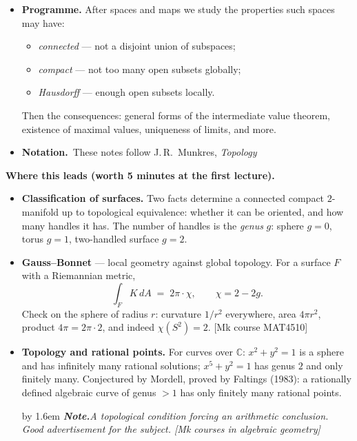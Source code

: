\documentclass[12pt,a4paper]{article}
\newcommand{\Ntn}{\textbf{Notation.}~}
\newcommand{\Mk}[1]{{\footnotesize\textcolor{cue}{[Mk #1]}}}  %
\newcommand{\Cue}[1]{%
  \par\addvspace{7pt}\nopagebreak
  \begingroup
    \advance\leftskip by 1.6em
    \parindent=0pt \small\color{cue}%
    \textbf{\textit{Note.}}\enspace \textit{#1}\par
  \endgroup
  \addvspace{9pt}}
\newenvironment{BL}%
  {\begin{itemize}[leftmargin=1.4em,labelsep=0.55em,itemsep=11pt,topsep=11pt,parsep=0pt]}%
  {\end{itemize}}
\newenvironment{SB}%
  {\begin{itemize}[label=--,leftmargin=1.3em,labelsep=0.45em,itemsep=6pt,topsep=7pt,parsep=0pt]}%
  {\end{itemize}}
\newcommand{\RR}{\mathbb{R}}
\newcommand{\CX}{\mathbb{C}}
\begin{document}
\begin{BL}
      subsequent definition of a continuous map. Same pattern as linear algebra: ``$f$ is
      linear if $f(\lambda x+\mu y)=\lambda f(x)+\mu f(y)$'' is simple, but presupposes the
      abstract definition of a real vector space, which in turn presupposes the nine-odd field
      axioms for $\RR$.
\Cue{Moral: axiomatisations of the most fundamental objects are general enough to be hard to
grasp at once. It is the \emph{relations} between them --- continuous maps, linear
transformations --- that are concrete. Say this early; it defuses a lot of anxiety.}
\item \textbf{Programme.} After spaces and maps we study the properties such spaces may have:
  \begin{SB}
  \item \emph{connected} --- not a disjoint union of subspaces;
  \item \emph{compact} --- not too many open subsets globally;
  \item \emph{Hausdorff} --- enough open subsets locally.
  \end{SB}
  Then the consequences: general forms of the intermediate value theorem, existence of maximal
  values, uniqueness of limits, and more.
\item \Ntn These notes follow J.\,R.\ Munkres, \emph{Topology}
\end{BL}

\textbf{Where this leads (worth 5 minutes at the first lecture).}

\begin{BL}
\item \textbf{Classification of surfaces.} Two facts determine a connected compact
      $2$-manifold up to topological equivalence: whether it can be oriented, and how many
      handles it has. The number of handles is the \emph{genus} $g$:
      sphere $g=0$, torus $g=1$, two-handled surface $g=2$.
\item \textbf{Gauss--Bonnet} --- local geometry against global topology. For a surface $F$ with
      a Riemannian metric,
  \[ \int_F K\,dA \;=\; 2\pi\cdot\chi, \qquad \chi=2-2g. \]
  Check on the sphere of radius $r$: curvature $1/r^2$ everywhere, area $4\pi r^2$, product
  $4\pi=2\pi\cdot2$, and indeed $\chi(S^2)=2$. \Mk{course MAT4510}
\item \textbf{Topology and rational points.} For curves over $\CX$:
      $x^2+y^2=1$ is a sphere and has infinitely many rational solutions;
      $x^5+y^2=1$ has genus $2$ and only finitely many.
      Conjectured by Mordell, proved by Faltings (1983): a rationally defined algebraic curve
      of genus $>1$ has only finitely many rational points.
\Cue{A topological condition forcing an arithmetic conclusion. Good advertisement for the
subject. \Mk{courses in algebraic geometry}}
\end{BL}
\end{document}
